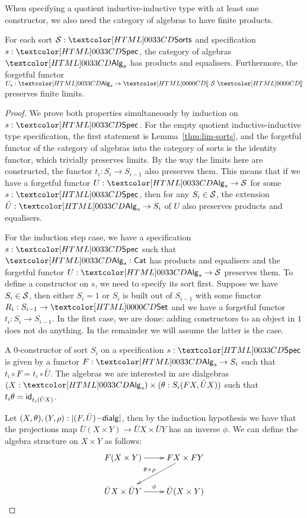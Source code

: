 When specifying a quotient inductive-inductive type with at least one constructor, we also need
the category of algebras to have finite products.

\begin{lemma}
  For each sort $\Ss : \Sorts$ and specification $s : \Spec$, the
  category of algebras $\Alg_s$ has products and
  equalisers. Furthermore, the forgetful functor
  $U_s : \Alg_s \to \SortCat{\Ss}$ preserves finite limits.
\end{lemma}
\begin{proof}
  We prove both properties simultaneously by induction on $s : \Spec$.
  For the empty quotient inductive-inductive type specification, the first statement is
  Lemma~\ref{thm:lim-sorts}, and the forgetful functor of the category
  of algebras into the category of sorts is the identity functor,
  which trivially preserves limits. By the way the limits here are
  constructed, the functor $t_i : S_i \to S_{i-1}$ also preserves
  them. This means that if we have a forgetful functor
  $U : \Alg_s \to \Ss$ for some $s : \Spec$, then for any
  $S_i \in \mathcal{S}$, the extension $\bar{U} : \Alg_s \to S_i$ of $U$ also
  preserves products and equalisers.

For the induction step case, we have a specification $s : \Spec$ such that
$\Alg_s : \Cat$ has products and equalisers and the forgetful functor
$U : \Alg_s \to \Ss$ preserves them. To define a constructor on $s$,
we need to specify its sort first. Suppose we have $S_i \in \mathcal{S}$, then
either $S_i = 1$ or $S_i$ is built out of $S_{i-1}$ with some functor
$R_i : S_{i-1} \to \Set$ and we have a forgetful functor
$t_i : S_i \to S_{i-1}$. In the first case, we are done: adding
constructors to an object in $1$ does not do anything. In the
remainder we will assume the latter is the case.

A 0-constructor of sort $S_i$ on a specification $s : \Spec$ is given
by a functor $F : \Alg_s \to S_i$ such that
$t_i \circ F = t_i \circ \bar{U}$. The algebras we are interested in
are dialgebras $(X : \Alg_s) \times (\theta : S_i(FX, \bar{U}X))$ such
that $t_i \theta = \mathsf{id}_{t_i (\bar{U}X)}$.

Let $(X,\theta), (Y,\rho) : | (F,\bar{U})\mathsf{-dialg} |$, then by the
induction hypothesis we have that the projections map
$\bar{U}(X \times Y) \to \bar{U}X \times \bar{U}Y$ has an inverse
$\phi$. We can define the algebra structure on $X \times Y$ as
follows:
$$
\xymatrix{
F(X \times Y) \ar[r] &
FX \times FY \ar[ld]_{\theta \times \rho} \\
\bar{U}X \times \bar{U}Y \ar[r]^{\phi} &
\bar{U}(X \times Y)
}
$$


\end{proof}
